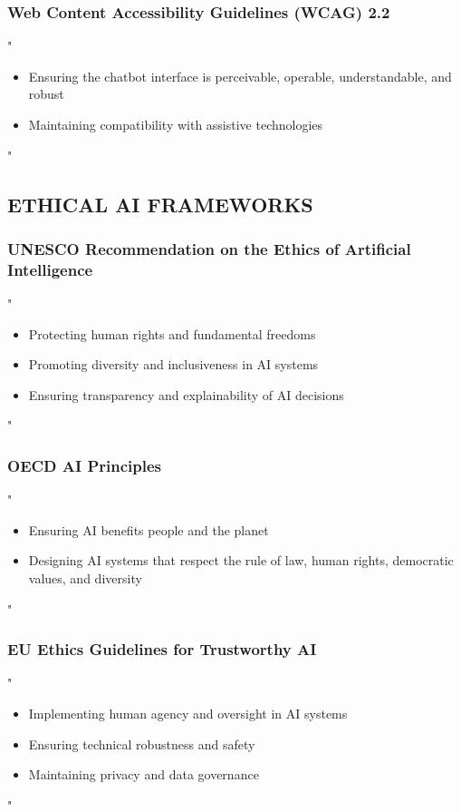 \documentclass[14pt,a4paper]{article}
\begin{document}
\textit{\parencite{IMSGlobal2024}}


\subsubsection*{Web Content Accessibility Guidelines (WCAG) 2.2}
"
\begin{itemize}
    \item Ensuring the chatbot interface is perceivable, operable, understandable, and robust
    \item Maintaining compatibility with assistive technologies
\end{itemize}
"

\textit{\parencite{W3C2023}}

\subsection*{ETHICAL AI FRAMEWORKS}

\subsubsection*{UNESCO Recommendation on the Ethics of Artificial Intelligence}
"
\begin{itemize}
    \item Protecting human rights and fundamental freedoms
    \item Promoting diversity and inclusiveness in AI systems
    \item Ensuring transparency and explainability of AI decisions
\end{itemize}
"

\textit{\parencite{UNESCO2021}}

\subsubsection*{OECD AI Principles}
"
\begin{itemize}
    \item Ensuring AI benefits people and the planet
    \item Designing AI systems that respect the rule of law, human rights, democratic values, and diversity
\end{itemize}
"

\textit{\parencite{OECD2023}}

\subsubsection*{EU Ethics Guidelines for Trustworthy AI}
"
\begin{itemize}
    \item Implementing human agency and oversight in AI systems
    \item Ensuring technical robustness and safety
    \item Maintaining privacy and data governance
\end{itemize}
"
\end{document}
